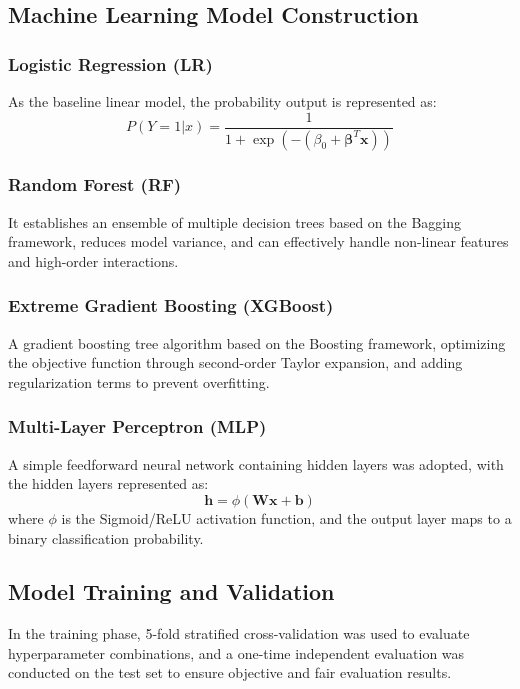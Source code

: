 \documentclass[12pt, a4paper]{article}
\begin{document}
\subsection{Machine Learning Model Construction}
\subsubsection{Logistic Regression (LR)}
As the baseline linear model, the probability output is represented as:
\begin{equation}
P(Y=1|x) = \frac{1}{1 + \exp(-(\beta_0 + \boldsymbol{\beta}^T \mathbf{x}))}
\end{equation}

\subsubsection{Random Forest (RF)}
It establishes an ensemble of multiple decision trees based on the Bagging framework, reduces model variance, and can effectively handle non-linear features and high-order interactions.

\subsubsection{Extreme Gradient Boosting (XGBoost)}
A gradient boosting tree algorithm based on the Boosting framework, optimizing the objective function through second-order Taylor expansion, and adding regularization terms to prevent overfitting.

\subsubsection{Multi-Layer Perceptron (MLP)}
A simple feedforward neural network containing hidden layers was adopted, with the hidden layers represented as:
\begin{equation}
\mathbf{h} = \phi(\mathbf{W}\mathbf{x} + \mathbf{b})
\end{equation}
where $\phi$ is the Sigmoid/ReLU activation function, and the output layer maps to a binary classification probability.

\subsection{Model Training and Validation}
In the training phase, 5-fold stratified cross-validation was used to evaluate hyperparameter combinations, and a one-time independent evaluation was conducted on the test set to ensure objective and fair evaluation results.
\end{document}
